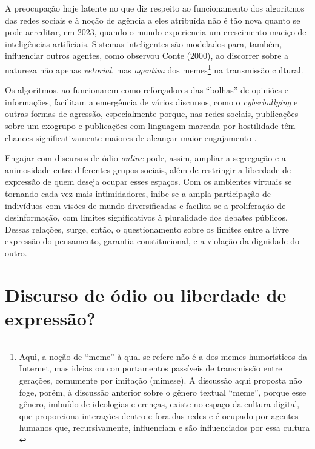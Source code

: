 \documentclass[portuguese]{textolivre}
\begin{document}
A preocupação hoje latente no que diz respeito ao funcionamento dos algoritmos das redes sociais e à noção de agência a eles atribuída não é tão nova quanto se pode acreditar, em 2023, quando o mundo experiencia um crescimento maciço de inteligências artificiais. Sistemas inteligentes são modelados para, também, influenciar outros agentes, como observou Conte (2000), ao discorrer sobre a natureza não apenas \emph{vetorial}, mas \emph{agentiva} dos memes\footnote{Aqui, a noção de “meme” à qual se refere \textcite{conte2000} não é a dos memes humorísticos da Internet, mas ideias ou comportamentos passíveis de transmissão entre gerações, comumente por imitação (mimese). A discussão aqui proposta não foge, porém, à discussão anterior sobre o gênero textual “meme”, porque esse gênero, imbuído de ideologias e crenças, existe no espaço da cultura digital, que proporciona interações dentro e fora das redes e é ocupado por agentes humanos que, recursivamente, influenciam e são influenciados por essa cultura \cite{wiggins2019discursive}} na transmissão cultural. 

Os algoritmos, ao funcionarem como reforçadores das “bolhas” de opiniões e informações, facilitam a emergência de vários discursos, como o \emph{cyberbullying} \cite{wiggins2019discursive} e outras formas de agressão, especialmente porque, nas redes sociais, publicações sobre um exogrupo e publicações com linguagem marcada por hostilidade têm chances significativamente maiores de alcançar maior engajamento \cite{rathje2021out}.

Engajar com discursos de ódio \textit{online} pode, assim, ampliar a segregação e a animosidade entre diferentes grupos sociais, além de restringir a liberdade de expressão de quem deseja ocupar esses espaços. Com os ambientes virtuais se tornando cada vez mais intimidadores, inibe-se a ampla participação de indivíduos com visões de mundo diversificadas e facilita-se a proliferação de desinformação, com limites significativos à pluralidade dos debates públicos. Dessas relações, surge, então, o questionamento sobre os limites entre a livre expressão do pensamento, garantia constitucional, e a violação da dignidade do outro.


\section{Discurso de ódio ou liberdade de expressão?}
\end{document}
